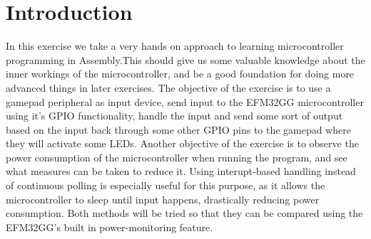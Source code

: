 \chapter{Introduction}
In this exercise we take a very hands on approach to learning microcontroller programming in Assembly.This should give us some valuable knowledge about the inner workings of the microcontroller, and be a good foundation for doing more advanced things in later exercises.
The objective of the exercise is to use a gamepad peripheral as input device, send input to the EFM32GG microcontroller using it's GPIO functionality, handle the input and send some sort of output based on the input back through some other GPIO pins to the gamepad where they will activate some LEDs.
Another objective of the exercise is to observe the power consumption of the microcontroller when running the program, and see what measures can be taken to reduce it. Using interupt-based handling instead of continuous polling is especially useful for this purpose, as it allows the microcontroller to sleep until input happens, drastically reducing power consumption. Both methods will be tried so that they can be compared using the EFM32GG's built in power-monitoring feature.
